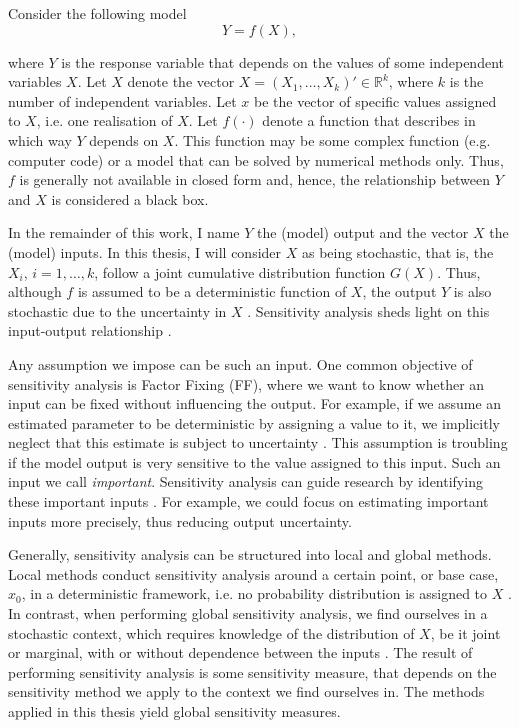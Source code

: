 
Consider the following model
\begin{equation*}
Y = f(X),
\end{equation*}

\noindent where $Y$ is the response variable that depends on the values of some independent variables $X$. Let $X$ denote the vector $X = (X_1, \dots, X_k)' \in \mathbb{R}^k$, where $k$ is the number of independent variables. Let $x$ be the vector of specific values assigned to $X$, i.e. one realisation of $X$. Let $f(\cdot)$ denote a function that describes in which way $Y$ depends on $X$. This function may be some complex function (e.g. computer code) or a model that can be solved by numerical methods only. Thus, $f$ is generally not available in closed form and, hence, the relationship between $Y$ and $X$ is considered a black box.

In the remainder of this work, I name $Y$ the (model) output and the vector $X$ the (model) inputs. In this thesis, I will consider $X$ as being stochastic, that is, the $X_i$, $i = 1,\dots, k$, follow a joint cumulative distribution function $G(X)$. Thus, although $f$ is assumed to be a deterministic function of $X$, the output $Y$ is also stochastic due to the uncertainty in $X$ \citep{SNS16}. Sensitivity analysis sheds light on this input-output relationship \citep{BP16}.

Any assumption we impose can be such an input. One common objective of sensitivity analysis is Factor Fixing (FF), where we want to know whether an input can be fixed without influencing the output. For example, if we assume an estimated parameter to be deterministic by assigning a value to it, we implicitly neglect that this estimate is subject to uncertainty \citep{R21}. This assumption is troubling if the model output is very sensitive to the value assigned to this input. Such an input we call \textit{important}. Sensitivity analysis can guide research by identifying these important inputs \citep{R21}. For example, we could focus on estimating important inputs more precisely, thus reducing output uncertainty.

Generally, sensitivity analysis can be structured into local and global methods. Local methods conduct sensitivity analysis around a certain point, or base case, $x_0$, in a deterministic framework, i.e. no probability distribution is assigned to $X$ \citep{BP16}. In contrast, when performing global sensitivity analysis, we find ourselves in a stochastic context, which requires knowledge of the distribution of $X$, be it joint or marginal, with or without dependence between the inputs \citep{ST02}. The result of performing sensitivity analysis is some sensitivity measure, that depends on the sensitivity method we apply to the context we find ourselves in. The methods applied in this thesis yield global sensitivity measures.

